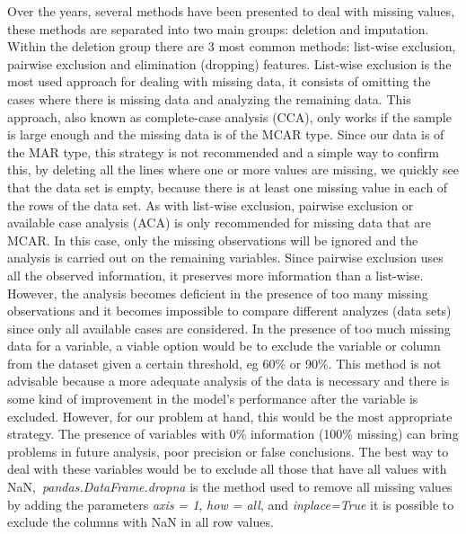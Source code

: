 Over the years, several methods have been presented to deal with missing values, these methods are separated into two main groups: deletion and imputation. Within the deletion group there are 3 most common methods: list-wise exclusion, pairwise exclusion and elimination (dropping) features. List-wise exclusion is the most used approach for dealing with missing data, it consists of omitting the cases where there is missing data and analyzing the remaining data. This approach, also known as complete-case analysis (CCA), only works if the sample is large enough and the missing data is of the MCAR type. Since our data is of the MAR type, this strategy is not recommended and a simple way to confirm this, by deleting all the lines where one or more values are missing, we quickly see that the data set is empty, because there is at least one missing value in each of the rows of the data set. As with list-wise exclusion, pairwise exclusion or available case analysis (ACA) is only recommended for missing data that are MCAR. In this case, only the missing observations will be ignored and the analysis is carried out on the remaining variables. Since pairwise exclusion uses all the observed information, it preserves more information than a list-wise. However, the analysis becomes deficient in the presence of too many missing observations and it becomes impossible to compare different analyzes (data sets) since only all available cases are considered. In the presence of too much missing data for a variable, a viable option would be to exclude the variable or column from the dataset given a certain threshold, eg 60\% or 90\%. This method is not advisable because a more adequate analysis of the data is necessary and there is some kind of improvement in the model's performance after the variable is excluded. However, for our problem at hand, this would be the most appropriate strategy. The presence of variables with 0\% information (100\% missing) can bring problems in future analysis, poor precision or false conclusions. The best way to deal with these variables would be to exclude all those that have all values with NaN,\ \textit{pandas.DataFrame.dropna} is the method used to remove all missing values by adding the parameters \textit{axis = 1}, \textit{how = all}, and \textit{inplace=True} it is possible to exclude the columns with NaN in all row values.

